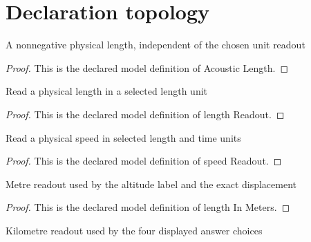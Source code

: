 \section{Declaration topology}
\begin{definition}
  \label{def:physics:phyx-mini-0221:phyxminiproblems-problemphyxmini0221-acousticlength}
  A nonnegative physical length, independent of the chosen unit readout
\end{definition}
\begin{proof}
  This is the declared model definition of Acoustic Length.
\end{proof}
\begin{definition}
  \label{def:physics:phyx-mini-0221:phyxminiproblems-problemphyxmini0221-lengthreadout}
  Read a physical length in a selected length unit
\end{definition}
\begin{proof}
  This is the declared model definition of length Readout.
\end{proof}
\begin{definition}
  \label{def:physics:phyx-mini-0221:phyxminiproblems-problemphyxmini0221-speedreadout}
  Read a physical speed in selected length and time units
\end{definition}
\begin{proof}
  This is the declared model definition of speed Readout.
\end{proof}
\begin{definition}
  \label{def:physics:phyx-mini-0221:phyxminiproblems-problemphyxmini0221-lengthinmeters}
  Metre readout used by the altitude label and the exact displacement
\end{definition}
\begin{proof}
  This is the declared model definition of length In Meters.
\end{proof}
\begin{definition}
  \label{def:physics:phyx-mini-0221:phyxminiproblems-problemphyxmini0221-lengthinkilometers}
  Kilometre readout used by the four displayed answer choices
\end{definition}
